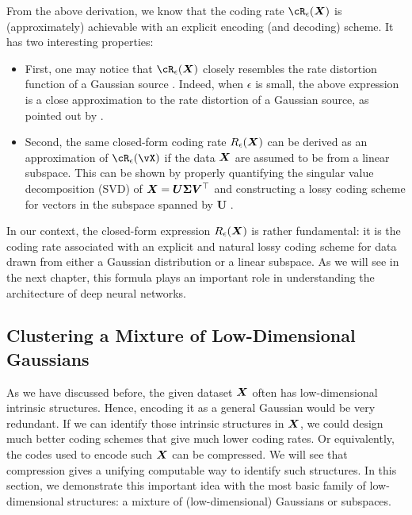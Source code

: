 \documentclass[../../book-main.tex]{subfiles}
\begin{document}
From the above derivation, we know that the coding rate $\cR_{\epsilon}(\X)$ is (approximately) achievable with an explicit encoding (and decoding) scheme. It has two interesting  properties:
\begin{itemize}
	\item First, one may notice that $\cR_{\epsilon}(\X)$ closely resembles the rate distortion function of a Gaussian source \cite{Cover-Thomas}. Indeed, when $\epsilon$ is small, the above expression is a close approximation to the rate distortion of a Gaussian source, as pointed out by   \cite{MaY2007-PAMI}.
	\item Second, the same closed-form coding rate $R_{\epsilon}(\bm{X})$ can be derived as an approximation of \(\cR_{\epsilon}(\vX)\) if the data $\bm{X}$ are assumed to be from a linear subspace. This can be shown by properly quantifying the singular value decomposition (SVD) of $\bm{X} = \boldsymbol{U} \boldsymbol{\Sigma}\boldsymbol{V}^\top$ and constructing a lossy coding scheme for vectors in the subspace spanned by $\boldsymbol{U}$ \cite{MaY2007-PAMI}.
\end{itemize}
In our context, the closed-form expression $R_{\epsilon}(\bm{X})$ is rather fundamental: it is the coding rate associated with an explicit and natural lossy coding scheme for data drawn from either a Gaussian distribution or a linear subspace. As we will see in the next chapter, this formula plays an important role in understanding the architecture of deep neural networks.


\subsection{Clustering a Mixture of Low-Dimensional Gaussians}
\label{sec:clustering-Gaussians}
As we have discussed before, the given dataset $\bm{X}$ often has low-dimensional intrinsic structures. Hence, encoding it as a general Gaussian would be very redundant. If we can identify those intrinsic structures in $\bm{X}$, we could design much better coding schemes that give much lower coding rates. Or equivalently, the codes used to encode such $\bm{X}$ can be compressed. We will see that compression gives a unifying computable way to identify such structures. In this section, we demonstrate this important idea with the most basic family of low-dimensional structures: a mixture of (low-dimensional) Gaussians or subspaces.
\end{document}
